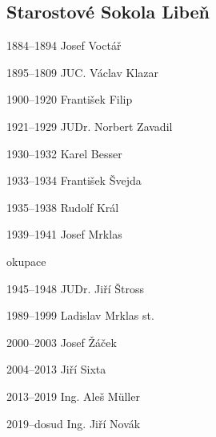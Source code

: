 \documentclass[a5paper, 11pt, twoside]{article}
\begin{document}
\subsection{Starostové Sokola Libeň }
\setlength{\parindent}{0pt}

1884--1894 Josef Voctář

1895--1809 JUC. Václav Klazar

1900--1920 František Filip

1921--1929 JUDr. Norbert Zavadil

1930--1932 Karel Besser

1933--1934 František Švejda

1935--1938 Rudolf Král

1939--1941 Josef Mrklas

\vspace*{6pt}
okupace
\vspace*{6pt}

1945--1948 JUDr. Jiří Štross

1989--1999 Ladislav Mrklas st.

2000--2003 Josef Žáček

2004--2013 Jiří Sixta

2013--2019 Ing. Aleš Müller

2019--dosud Ing. Jiří Novák
\end{document}

